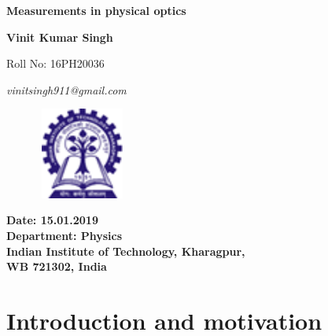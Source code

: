 \documentclass[12pt]{report}
\begin{document}
	\thispagestyle{empty}
	
	\begin{center}
		{\Huge \bf Measurements in physical optics}
	\end{center}
	\vspace{0.5cm}
	{\par}
	{\par}
	
	\vspace{5.5cm}
	
	{\centering \textbf{\Large Vinit Kumar Singh}\par}
	{\centering \large Roll No: 16PH20036 \par}
	{\centering \large \em vinitsingh911@gmail.com \par}
	\vspace{0.5cm}
	
	\begin{figure}[h]
		\centering
		\includegraphics[height=3cm,width=3cm]{IIT_Logo.png}
	\end{figure}
	
	\begin{center}
		{\textbf{Date: 15.01.2019} \\
			\textbf{Department: Physics} \\
			\textbf{Indian Institute of Technology, Kharagpur,}\\
			\textbf {WB 721302, India}\\
			
		}
	\end{center}
	\newpage
	\tableofcontents
	
	\newpage
	\chapter{Introduction and motivation}
\end{document}
